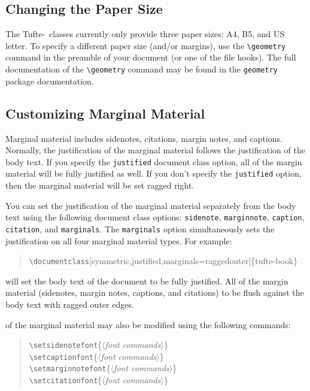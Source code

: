 \documentclass[a4paper]{tufte-handout}
\newcommand{\TL}{Tufte-\hologo{LaTeX}\xspace}
\newcommand{\hlorange}[1]{\textcolor{tufte-orange}{#1}}
\newcommand{\doccmd}[1]{\hlorange{\texttt{\textbackslash#1}}}
\newcommand{\docopt}[1]{\( \langle \)\textrm{\textit{#1}}\( \rangle \)}
\newcommand{\docpkg}[1]{\hlorange{\texttt{#1}}}
\newcommand{\docclsopt}[1]{\hlorange{\texttt{#1}}}
\newenvironment{docspec}
  {\begin{quotation}\ttfamily\parskip0pt\parindent0pt\ignorespaces}
  {\end{quotation}}
\begin{document}
\subsection{Changing the Paper Size}\label{sec:changing-paper-size}
The \TL\ classes currently only provide three paper sizes: \textsc{A4}, \textsc{B5}, and \textsc{US} letter.
To specify a different paper size (and/or margins), use the \doccmd{geometry} command in the preamble of your
document (or one of the file hooks).
The full documentation of the \doccmd{geometry} command may be found in the \docpkg{geometry} package documentation.%
\cite{pkg-geometry}

\subsection{Customizing Marginal Material}\label{sec:customizing-marginal-material}
Marginal material includes sidenotes, citations, margin notes, and captions.
Normally, the justification of the marginal material follows the justification of the body text. 
If you specify the \docclsopt{justified} document class option, all of the margin material will be fully justified as well. 
If you don't specify the \docclsopt{justified} option, then the marginal material will be set ragged right.

You can set the justification of the marginal material separately from the body text using the following document class options: \docclsopt{sidenote}, \docclsopt{marginnote}, \docclsopt{caption}, \docclsopt{citation}, and \docclsopt{marginals}.
The \docclsopt{marginals} option simultaneously sets the justification on all four marginal material types.
For example: 
\begin{docspec}
  \doccmd{documentclass}[symmetric,justified,marginals=raggedouter]\{tufte-book\}
\end{docspec}
will set the body text of the document to be fully justified.
All of the margin material (sidenotes, margin notes, captions, and citations) to be flush against the body text with ragged outer edges.

 of the marginal material may also be modified using the following commands:

\begin{docspec}
  \doccmd{setsidenotefont}\{\docopt{font commands}\} \\
  \doccmd{setcaptionfont}\{\docopt{font commands}\} \\
  \doccmd{setmarginnotefont}\{\docopt{font commands}\} \\
  \doccmd{setcitationfont}\{\docopt{font commands}\}
\end{docspec}
\end{document}
